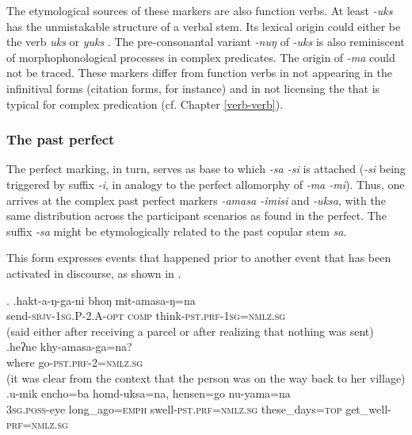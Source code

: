 The etymological sources of these markers are also function verbs. At least \emph{-uks} has the unmistakable structure of a verbal stem. Its lexical origin could either be the verb \emph{uks}  or \emph{yuks} . The pre-consonantal variant \emph{-nuŋ} of \emph{-uks} is also reminiscent of morphophonological processes in complex predicates. The origin of \emph{-ma} could not be traced. These markers differ from function verbs   in not appearing in the infinitival forms (citation forms, for instance) and in not licensing the  that is typical for complex predication (cf. Chapter \ref{verb-verb}). 

	
\subsubsection{The past perfect}\label{pstprf}
	
The perfect marking, in turn, serves as base to which \emph{-sa \ti -si} is attached (\emph{-si} being triggered by suffix \emph{-i}, in analogy to the perfect allomorphy of \emph{-ma \ti -mi}). Thus, one arrives at the complex past perfect markers \emph{-amasa \ti -imisi} and  \emph{-uksa}, with the same distribution across the participant scenarios as found in the perfect. The suffix \emph{-sa} might be etymologically related to the past copular stem \emph{sa}. 

This  form expresses events that happened prior to another event that has been activated in discourse, as shown in \Next.

\ex. \ag.hakt-a-ŋ-ga-ni bhoŋ mit-amasa-ŋ=na\\
send{\scshape -sbjv-1sg.P-2.A-opt} {\scshape comp} think{\scshape -pst.prf-1sg=nmlz.sg}\\
 (said either after receiving a parcel or after realizing that nothing was sent)
\bg.heʔne khy-amasa-ga=na?\\
where go{\scshape -pst.prf-2=nmlz.sg}\\
 (it was clear from the context that the person was on the way back to her village) 
	\bg.u-mik encho=ba homd-uksa=na, hensen=go nu-yama=na\\
		{\scshape 3sg.poss-}eye long\_ago{\scshape =emph} swell{\scshape -pst.prf=nmlz.sg} these\_days{\scshape =top} get\_well{\scshape -prf=nmlz.sg}\\
		
